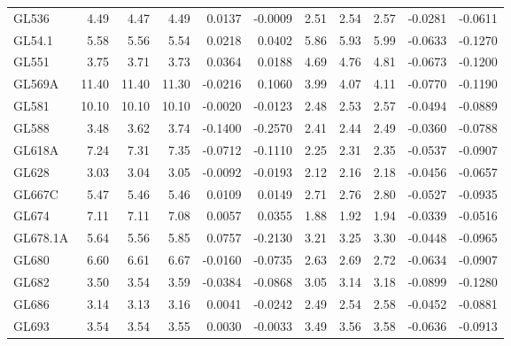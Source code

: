 \begin{longtable}{|l||r|r|r|r|r||r|r|r|r|r|}
GL536 & 4.49 & 4.47 & 4.49 & 0.0137 & -0.0009 & 2.51 & 2.54 & 2.57 & -0.0281 & -0.0611\\
GL54.1 & 5.58 & 5.56 & 5.54 & 0.0218 & 0.0402 & 5.86 & 5.93 & 5.99 & -0.0633 & -0.1270\\   
GL551 & 3.75 & 3.71 & 3.73 & 0.0364 & 0.0188 & 4.69 & 4.76 & 4.81 & -0.0673 & -0.1200\\     
GL569A & 11.40 & 11.40 & 11.30 & -0.0216 & 0.1060 & 3.99 & 4.07 & 4.11 & -0.0770 & -0.1190\\    
GL581 & 10.10 & 10.10 & 10.10 & -0.0020 & -0.0123 & 2.48 & 2.53 & 2.57 & -0.0494 & -0.0889\\
GL588 & 3.48 & 3.62 & 3.74 & -0.1400 & -0.2570 & 2.41 & 2.44 & 2.49 & -0.0360 & -0.0788\\     
GL618A & 7.24 & 7.31 & 7.35 & -0.0712 & -0.1110 & 2.25 & 2.31 & 2.35 & -0.0537 & -0.0907\\ 
GL628 & 3.03 & 3.04 & 3.05 & -0.0092 & -0.0193 & 2.12 & 2.16 & 2.18 & -0.0456 & -0.0657\\
GL667C & 5.47 & 5.46 & 5.46 & 0.0109 & 0.0149 & 2.71 & 2.76 & 2.80 & -0.0527 & -0.0935\\   
GL674 & 7.11 & 7.11 & 7.08 & 0.0057 & 0.0355 & 1.88 & 1.92 & 1.94 & -0.0339 & -0.0516\\  
GL678.1A & 5.64 & 5.56 & 5.85 & 0.0757 & -0.2130 & 3.21 & 3.25 & 3.30 & -0.0448 & -0.0965\\ 
GL680 & 6.60 & 6.61 & 6.67 & -0.0160 & -0.0735 & 2.63 & 2.69 & 2.72 & -0.0634 & -0.0907\\   
GL682 & 3.50 & 3.54 & 3.59 & -0.0384 & -0.0868 & 3.05 & 3.14 & 3.18 & -0.0899 & -0.1280\\   
GL686 & 3.14 & 3.13 & 3.16 & 0.0041 & -0.0242 & 2.49 & 2.54 & 2.58 & -0.0452 & -0.0881\\ 
GL693 & 3.54 & 3.54 & 3.55 & 0.0030 & -0.0033 & 3.49 & 3.56 & 3.58 & -0.0636 & -0.0913\\

\end{longtable}
